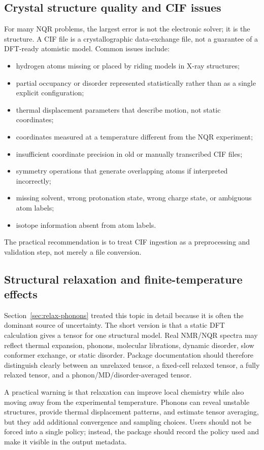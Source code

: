 \documentclass[11pt]{article}
\begin{document}
\subsection{Crystal structure quality and CIF issues}

For many NQR problems, the largest error is not the electronic solver; it is the structure.  A CIF file is a crystallographic data-exchange file, not a guarantee of a DFT-ready atomistic model.  Common issues include:
\begin{itemize}
\item hydrogen atoms missing or placed by riding models in X-ray structures;
\item partial occupancy or disorder represented statistically rather than as a single explicit configuration;
\item thermal displacement parameters that describe motion, not static coordinates;
\item coordinates measured at a temperature different from the NQR experiment;
\item insufficient coordinate precision in old or manually transcribed CIF files;
\item symmetry operations that generate overlapping atoms if interpreted incorrectly;
\item missing solvent, wrong protonation state, wrong charge state, or ambiguous atom labels;
\item isotope information absent from atom labels.
\end{itemize}
The practical recommendation is to treat CIF ingestion as a preprocessing and validation step, not merely a file conversion.

\subsection{Structural relaxation and finite-temperature effects}

Section~\ref{sec:relax-phonons} treated this topic in detail because it is often the dominant source of uncertainty.  The short version is that a static DFT calculation gives a tensor for one structural model.  Real NMR/NQR spectra may reflect thermal expansion, phonons, molecular librations, dynamic disorder, slow conformer exchange, or static disorder.  Package documentation should therefore distinguish clearly between an unrelaxed tensor, a fixed-cell relaxed tensor, a fully relaxed tensor, and a phonon/MD/disorder-averaged tensor.

A practical warning is that relaxation can improve local chemistry while also moving away from the experimental temperature.  Phonons can reveal unstable structures, provide thermal displacement patterns, and estimate tensor averaging, but they add additional convergence and sampling choices.  Users should not be forced into a single policy; instead, the package should record the policy used and make it visible in the output metadata.
\end{document}
